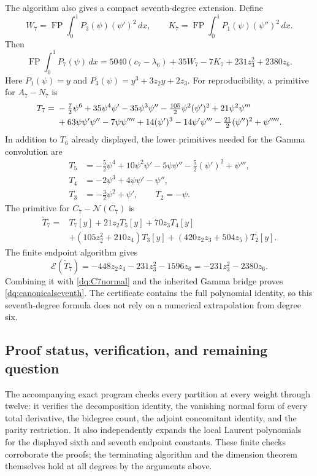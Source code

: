 The algorithm also gives a compact seventh-degree extension. Define
\[
 W_7=\operatorname{FP}\int_0^1P_3(\psi)(\psi')^2\,dx,
 \qquad
 K_7=\operatorname{FP}\int_0^1P_1(\psi)(\psi'')^2\,dx.
\]
Then
\begin{equation}\label{dq:canonicalseventh}
 \boxed{\displaystyle
 \operatorname{FP}\int_0^1P_7(\psi)\,dx
 =5040(c_7-\lambda_6)+35W_7-7K_7+231z_3^2+2380z_6.}
\end{equation}
Here $P_1(\psi)=y$ and $P_3(\psi)=y^3+3z_2y+2z_3$.
For reproducibility, a primitive for $A_7-N_7$ is
\begin{align}
 T_7={}&-\tfrac72\psi^6+35\psi^4\psi'-35\psi^3\psi''
        -\tfrac{105}2\psi^2(\psi')^2+21\psi^2\psi'''\notag\\
 &+63\psi\psi'\psi''-7\psi\psi''''+14(\psi')^3
        -14\psi'\psi'''-\tfrac{21}2(\psi'')^2+\psi'''''.
 \label{dq:T7}
\end{align}
In addition to $T_6$ already displayed, the lower primitives needed
for the Gamma convolution are
\begin{align*}
 T_5&=-\tfrac52\psi^4+10\psi^2\psi'-5\psi\psi''
                         -\tfrac52(\psi')^2+\psi''',\\
 T_4&=-2\psi^3+4\psi\psi'-\psi'',\\
 T_3&=-\tfrac32\psi^2+\psi',\qquad T_2=-\psi.
\end{align*}
The primitive for $C_7-\mathcal N(C_7)$ is
\begin{align*}
 \widetilde T_7={}&T_7[y]+21z_2T_5[y]+70z_3T_4[y]\\
  &+(105z_2^2+210z_4)T_3[y]+(420z_2z_3+504z_5)T_2[y].
\end{align*}
The finite endpoint algorithm gives
\[
 \mathcal E(\widetilde T_7)
 =-448z_2z_4-231z_3^2-1596z_6
 =-231z_3^2-2380z_6.
\]
Combining it with \eqref{dq:C7normal} and the inherited Gamma
bridge proves \eqref{dq:canonicalseventh}. The certificate contains
the full polynomial identity, so this seventh-degree formula does
not rely on a numerical extrapolation from degree six.

\subsection{Proof status, verification, and remaining question}

The accompanying exact program checks every partition at every weight
through twelve: it verifies the decomposition identity, the vanishing
normal form of every total derivative, the bidegree count, the adjoint
concomitant identity, and the parity restriction. It also independently
expands the local Laurent polynomials for the displayed sixth and
seventh endpoint constants. These finite checks corroborate the
proofs; the terminating algorithm and the dimension theorem themselves
hold at all degrees by the arguments above.

